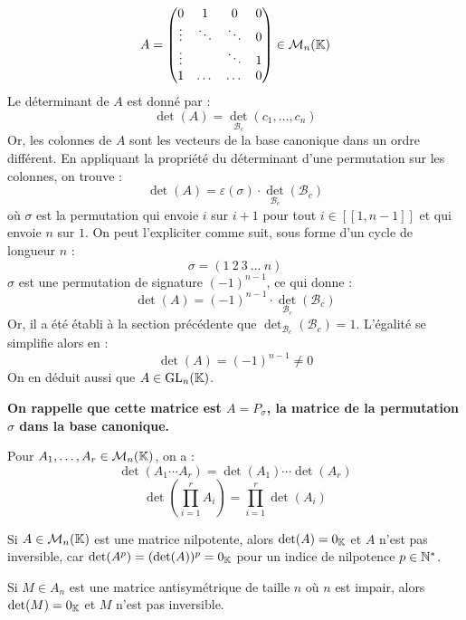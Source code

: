 \documentclass[12pt, a4paper]{report}
\begin{document}
\begin{example}
    $$A = \left(\begin{matrix} 0 & 1 & 0 & 0 \\ \vdots & \ddots & \ddots & 0 \\ \vdots & & \ddots & 1 \\ 1 & \dots & \dots & 0 \end{matrix}\right) \in \mathcal M_n(\mathbb{K})$$
    Le déterminant de $A$ est donné par :
    $$\det(A) = \det_{\mathcal{B}_c}(c_1, \dots, c_n)$$
    Or, les colonnes de $A$ sont les vecteurs de la base canonique dans un ordre différent. En appliquant la propriété du déterminant d'une permutation sur les colonnes, on trouve :
    $$\det(A) = \varepsilon(\sigma) \cdot \det_{\mathcal{B}_c}(\mathcal{B}_c)$$
    où $\sigma$ est la permutation qui envoie $i$ sur $i+1$ pour tout $i \in [\![1,n-1]\!]$ et qui envoie $n$ sur $1$. On peut l'expliciter comme suit, sous forme d'un cycle de longueur $n$ :
    $$\sigma = (1 \ 2 \ 3 \ \dots \ n)$$
    $\sigma$ est une permutation de signature $(-1)^{n-1}$, ce qui donne :
    $$\det(A) = (-1)^{n-1} \cdot \det_{\mathcal{B}_c}(\mathcal{B}_c)$$
    Or, il a été établi à la section précédente que $\det_{\mathcal{B}_c}(\mathcal{B}_c) = 1$. L'égalité se simplifie alors en :
    $$\det(A) = (-1)^{n-1} \ne 0$$
    On en déduit aussi que $A \in \mathrm{GL}_n(\mathbb{K})$.

    \textbf{On rappelle que cette matrice est $A = P_\sigma$, la matrice de la permutation $\sigma$ dans la base canonique.}
\end{example}

\begin{remark}
    Pour $A_1, \dots, A_r \in \mathcal M_n(\mathbb{K})$, on a :
    $$\det(A_1 \cdots A_r) = \det(A_1) \cdots \det(A_r)$$
    $$\det(\prod_{i=1}^{r} A_i) = \prod_{i=1}^{r} \det(A_i)$$
\end{remark}

\begin{remark}
    Si $A \in \mathcal M_n(\mathbb{K})$ est une matrice nilpotente, alors $\det(A) = 0_{\mathbb{K}}$ et $A$ n'est pas inversible, car $\det(A^p) = (\det(A))^p = 0_{\mathbb{K}}$ pour un indice de nilpotence $p \in \mathbb{N}^*$.
\end{remark}

\begin{remark}
    Si $M \in A_n$ est une matrice antisymétrique de taille $n$ où $n$ est impair, alors $\det(M) = 0_{\mathbb{K}}$ et $M$ n'est pas inversible.
\end{remark}
\end{document}
